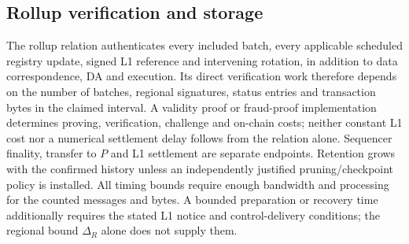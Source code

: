\documentclass[11pt,a4paper,onecolumn]{article}
\begin{document}
\subsection{Rollup verification and storage}
The rollup relation authenticates every included batch, every applicable
scheduled registry update, signed L1 reference and intervening rotation, in addition to data
correspondence, DA and execution. Its direct verification work therefore
depends on the number of batches, regional signatures, status entries and
transaction bytes in the claimed interval. A validity proof or fraud-proof
implementation determines proving, verification, challenge and on-chain
costs; neither constant L1 cost nor a numerical settlement delay follows
from the relation alone. Sequencer finality, transfer to $P$ and L1
settlement are separate endpoints. Retention grows with the confirmed
history unless an independently justified pruning/checkpoint policy is
installed. All timing bounds require enough bandwidth and processing for
the counted messages and bytes. A bounded preparation or recovery time
additionally requires the stated L1 notice and control-delivery conditions;
the regional bound $\Delta_R$ alone does not supply them.

\clearpage

\end{document}
